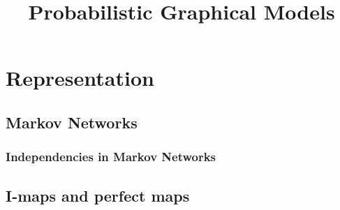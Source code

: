 \documentclass[a4paper,10pt]{article}
\title{Probabilistic Graphical Models}
\author{}
\begin{document}
\maketitle

\section{Representation}

\subsection{Markov Networks}

\subsubsection{Independencies in Markov Networks}



\subsection{I-maps and perfect maps}


\end{document}
